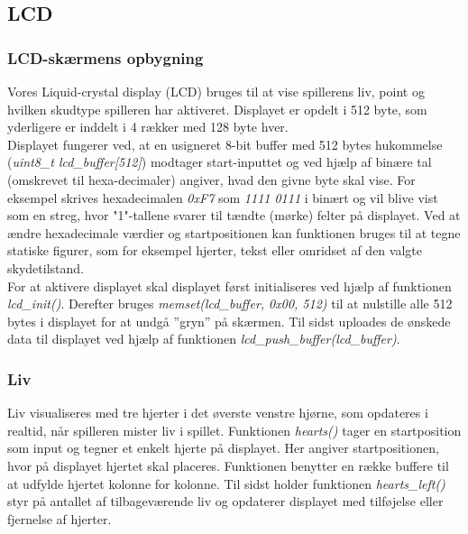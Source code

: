 \subsection{LCD}
\subsubsection{LCD-skærmens opbygning}
Vores Liquid-crystal display (LCD) bruges til at vise spillerens liv, point og hvilken skudtype spilleren har aktiveret. Displayet er opdelt i 512 byte, som yderligere er inddelt i 4 rækker med 128 byte hver.\\
Displayet fungerer ved, at en usigneret 8-bit buffer med 512 bytes hukommelse (\textit{uint8\_t lcd\_buffer[512]}) modtager start-inputtet og ved hjælp af binære tal (omskrevet til hexa-decimaler) angiver, hvad den givne byte skal vise. For eksempel skrives hexadecimalen \textit{0xF7} som \textit{1111 0111} i binært og vil blive vist som en streg, hvor "1"-tallene svarer til tændte (mørke) felter på displayet. Ved at ændre hexadecimale værdier og startpositionen kan funktionen bruges til at tegne statiske figurer, som for eksempel hjerter, tekst eller omridset af den valgte skydetilstand.\\
For at aktivere displayet skal displayet først initialiseres ved hjælp af funktionen \textit{lcd\_init()}. Derefter bruges \textit{memset(lcd\_buffer, 0x00, 512)} til at nulstille alle 512 bytes i displayet for at undgå ”gryn” på skærmen. Til sidst uploades de ønskede data til displayet ved hjælp af funktionen \textit{lcd\_push\_buffer(lcd\_buffer)}.

\subsubsection{Liv}
Liv visualiseres med tre hjerter i det øverste venstre hjørne, som opdateres i realtid, når spilleren mister liv i spillet. Funktionen \textit{hearts()} tager en startposition som input og tegner et enkelt hjerte på displayet. Her angiver startpositionen, hvor på displayet hjertet skal placeres. Funktionen benytter en række buffere til at udfylde hjertet kolonne for kolonne. Til sidst holder funktionen \textit{hearts\_left()} styr på antallet af tilbageværende liv og opdaterer displayet med tilføjelse eller fjernelse af hjerter.

